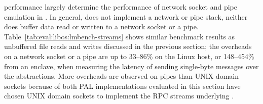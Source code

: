 
\label{sec:eval:libos:streams}


\begin{table}[t!b!]

\caption{Network socket and pipe performance based on \lmbench{}. Comparison is among (1) native Linux processes; (2) \graphene{} on Linux host, both without and with \seccomp{} filter ({\bf +SC}) and reference monitor ({\bf +RM}); (3) \graphenesgx{}.
System call latency is in microseconds, and lower is better.
System call bandwidth is in megabytes per second, and higher is better. 
Overheads are relative to Linux; negative overheads indicate improvement.} 
\label{tab:eval:libos:lmbench-streams}
\end{table}


\Thehostabi{} performance
largely determine
the performance of network socket and pipe emulation
in \thelibos{}.
In general, \thelibos{} does not implement a network or pipe stack,
neither does \thelibos{}
buffer data read or written to a network socket or a pipe.
Table~\ref{tab:eval:libos:lmbench-streams} shows similar benchmark results as
unbuffered file reads and writes discussed in the previous section;
the overheads on a network socket or a pipe are up to 33--86\% on the Linux host,
or 148--454\% from an enclave,
when measuring the latency of sending single-byte messages
over the abstractions.
More overheads
are observed on pipes than UNIX domain sockets because of both PAL implementations
evaluated in this section have chosen
UNIX domain sockets
to implement the RPC streams underlying \thelibos{}.
 
